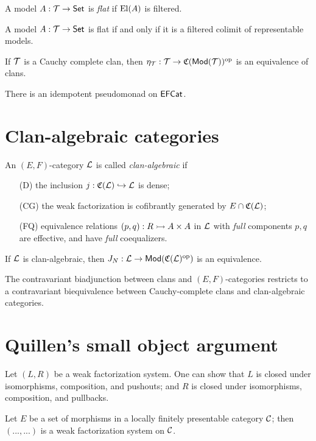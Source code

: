 \documentclass[a4paper]{article}
\begin{document}
\begin{definition}
  A model $A : \mathcal{T} \to \mathsf{Set}$ is \emph{flat} if $\operatorname{El}(A)$ is filtered.
\end{definition}

\begin{lemma}
  A model $A : \mathcal{T} \to \mathsf{Set}$ is flat if and only if it is a filtered colimit of representable models.
\end{lemma}

\begin{theorem}
  If $\mathcal{T}$ is a Cauchy complete clan, then $\eta_{\mathcal{T}} : \mathcal{T} \to \mathfrak{C}(\mathsf{Mod}(\mathcal{T}))^{\mathrm{op}}$ is an equivalence of clans.
\end{theorem}

There is an idempotent pseudomonad on $\mathsf{EFCat}$.

\section{Clan-algebraic categories}

\begin{definition}
  An $(E,F)$-category $\mathcal{L}$ is called \emph{clan-algebraic} if
  \begin{enumerate}
  \item[(D)] the inclusion $j : \mathfrak{C}(\mathcal{L}) \hookrightarrow \mathcal{L}$ is dense;
  \item[(CG)] the weak factorization is cofibrantly generated by $E \cap \mathfrak{C}(\mathcal{L})$;
  \item[(FQ)] equivalence relations $(p,q) : R \rightarrowtail A \times A$ in $\mathcal{L}$ with \emph{full} components $p, q$ are effective, and have \emph{full} coequalizers.
  \end{enumerate}
\end{definition}

\begin{theorem}
  If $\mathcal{L}$ is clan-algebraic, then $J_N : \mathcal{L} \to \mathsf{Mod}(\mathfrak{C}(\mathcal{L})^{\mathrm{op}})$ is an equivalence.
\end{theorem}

\begin{theorem}
  The contravariant biadjunction between clans and $(E,F)$-categories restricts to a contravariant biequivalence between Cauchy-complete clans and clan-algebraic categories.
\end{theorem}

\section{Quillen's small object argument}

Let $(L,R)$ be a weak factorization system.
One can show that $L$ is closed under isomorphisms, composition, and pushouts; and $R$ is closed under isomorphisms, composition, and pullbacks.

\begin{theorem}
  Let $E$ be a set of morphisms in a locally finitely presentable category $\mathcal{C}$; then $(...,...)$ is a weak factorization system on $\mathcal{C}$.
\end{theorem}

\printbibliography
\end{document}
